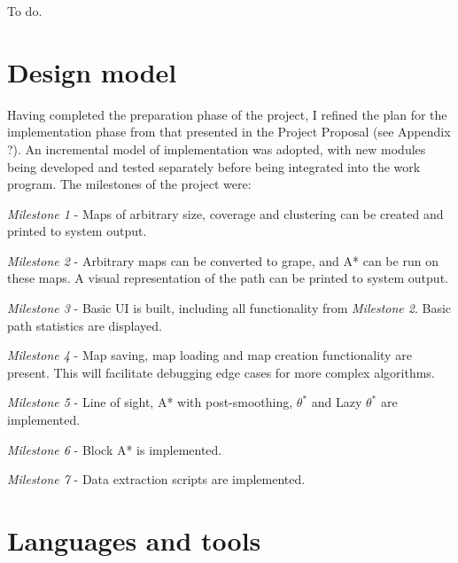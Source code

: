 \documentclass[12pt,twoside,notitlepage]{report}
\begin{document}
To do.

\section {Design model}

\noindent
Having completed the preparation phase of the project, I refined the plan for the implementation phase from that presented in the Project Proposal (see Appendix ?). An incremental model of implementation was adopted, with new modules being developed and tested separately before being integrated into the work program. The milestones of the project were:
\begin{description}
\item {\em Milestone 1} - Maps of arbitrary size, coverage and clustering can be created and printed to system output.
\item {\em Milestone 2} - Arbitrary maps can be converted to grape, and A* can be run on these maps. A visual representation of the path can be printed to system output.
\item {\em Milestone 3} - Basic UI is built, including all functionality from {\em Milestone 2}. Basic path statistics are displayed.
\item {\em Milestone 4} - Map saving, map loading and map creation functionality are present. This will facilitate debugging edge cases for more complex algorithms.
\item {\em Milestone 5} - Line of sight, A* with post-smoothing, $\theta ^{*}$ and Lazy $\theta ^{*}$ are implemented.
\item {\em Milestone 6} - Block A* is implemented.
\item {\em Milestone 7} - Data extraction scripts are implemented.
\end{description}

\section {Languages and tools}
\end{document}

